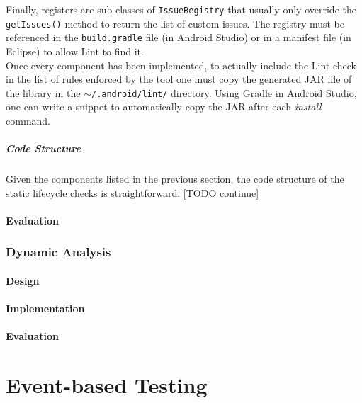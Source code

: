 \documentclass[11pt,a4paper,notitlepage]{article}
\begin{document}
Finally, registers are sub-classes of \texttt{IssueRegistry} that usually only override the \texttt{getIssues()} method to return the list of custom issues. The registry must be referenced in the \texttt{build.gradle} file (in Android Studio) or in a manifest file (in Eclipse) to allow Lint to find it.\bigskip \\
Once every component has been implemented, to actually include the Lint check in the list of rules enforced by the tool one must copy the generated JAR file of the library in the \texttt{$\sim$/.android/lint/} directory. Using Gradle in Android Studio, one can write a snippet to automatically copy the JAR after each \textit{install} command.

\subsubsection{Code Structure}
Given the components listed in the previous section, the code structure of the static lifecycle checks is straightforward. [TODO continue]

\subsection{Evaluation}



\section{Dynamic Analysis}

\subsection{Design}

\subsection{Implementation}

\subsection{Evaluation}



\part{Event-based Testing}
\end{document}
